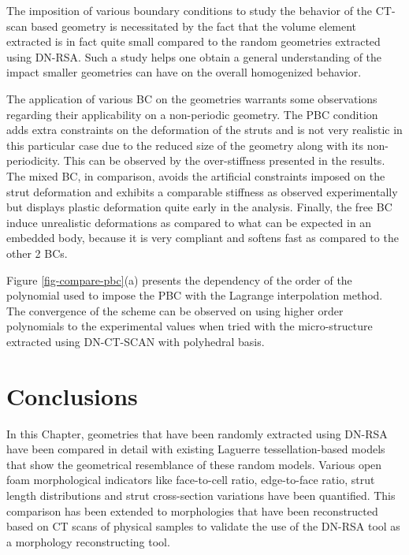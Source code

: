 The imposition of various boundary conditions to study the behavior of the CT-scan based geometry is necessitated by the fact that the volume element extracted is in fact quite small compared to the random geometries extracted using DN-RSA. Such a study helps one obtain a general understanding of the impact smaller geometries can have on the overall homogenized behavior.

The application of various BC on the geometries warrants some observations regarding their applicability on a non-periodic geometry. The PBC condition adds extra constraints on the deformation of the struts and is not very realistic in this particular case due to the reduced size of the geometry along with its non-periodicity. This can be observed by the over-stiffness presented in the results. The mixed BC, in comparison, avoids the artificial constraints imposed on the strut deformation and exhibits a comparable stiffness as observed experimentally but displays plastic deformation quite early in the analysis. Finally, the free BC induce unrealistic deformations as compared to what can be expected in an embedded body, because it is very compliant and softens fast as compared to the other 2 BCs.

Figure \ref{fig-compare-pbc}(a) presents the dependency of the order of the polynomial used to impose the PBC with the Lagrange interpolation method. The convergence of the scheme can be observed on using higher order polynomials to the experimental values when tried with the micro-structure extracted using DN-CT-SCAN with polyhedral basis.

\section{Conclusions}
In this Chapter, geometries that have been randomly extracted using DN-RSA have been compared in detail with existing Laguerre tessellation-based models that show the geometrical resemblance of these random models. Various open foam morphological indicators like face-to-cell ratio, edge-to-face ratio, strut length distributions and strut cross-section variations have been quantified. This comparison has been extended to morphologies that have been reconstructed based on CT scans of physical samples to validate the use of the DN-RSA tool as a morphology reconstructing tool. 

